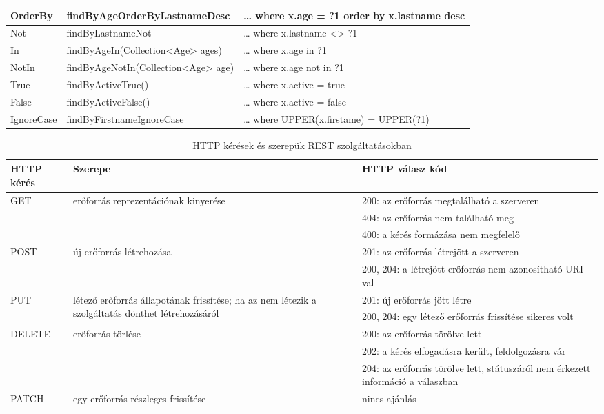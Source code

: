 \begin{longtable}{| p{.20\linewidth} | p{.30\linewidth} | p{.50\linewidth } |}
			\hline
			OrderBy &	findByAgeOrderByLastnameDesc	& … where x.age = ?1 order by x.lastname desc \\
			\hline
			Not &	findByLastnameNot	& … where x.lastname <> ?1 \\
			\hline
			In &	findByAgeIn(Collection<Age> \linebreak ages)	& … where x.age in ?1 \\
			\hline
			NotIn &	findByAgeNotIn(Collection<Age> \linebreak age)	& … where x.age not in ?1 \\
			\hline
			True &	findByActiveTrue()	& … where x.active = true \\
			\hline
			False &	findByActiveFalse()	& … where x.active = false \\
			\hline
			IgnoreCase &	findByFirstnameIgnoreCase	& … where UPPER(x.firstame) = UPPER(?1) \\
			\hline
	\end{longtable}

	\begin{longtable}{| p{.20\linewidth} | p{.50\linewidth} | p{.30\linewidth } |}		
					\caption{HTTP kérések és szerepük REST szolgáltatásokban}
		\label{tab:restAndHttp} \\
		\hline
		HTTP kérés & Szerepe & HTTP válasz kód \\
		\hline
		
		\multirow{3}{*}{GET} & \multirow{3}{*}{erőforrás reprezentációnak kinyerése} & 
		 200: az erőforrás megtalálható a szerveren \\
		 \cline{3-3}
		  & & 404: az erőforrás nem található meg \\
		  		 \cline{3-3}
		  & & 400: a kérés formázása nem megfelelő \\
		\hline
		
		\multirow{2}{*}{POST} & \multirow{2}{*}{új erőforrás létrehozása} & 
		201: az erőforrás létrejött a szerveren\\
		\cline{3-3}
		& & 200, 204: a létrejött erőforrás nem azonosítható URI-val \\
		\hline
		
		\multirow{2}{*}{PUT} & \multirow{2}{*}{\parbox{\linewidth}{létező erőforrás állapotának frissítése; ha az nem létezik a  szolgáltatás dönthet létrehozásáról}} & 
		201: új erőforrás jött létre \\
		\cline{3-3}
		& & 200, 204: egy létező erőforrás frissítése sikeres volt \\
		\hline
		
		\multirow{3}{*}{DELETE} & \multirow{3}{*}{erőforrás törlése} & 
		200: az erőforrás törölve lett \\
		\cline{3-3}
		& & 202: a kérés elfogadásra került, feldolgozásra vár \\
		\cline{3-3}
		& & 204: az erőforrás törölve lett, státuszáról nem érkezett információ a válaszban \\
		\hline
		
		PATCH & egy erőforrás részleges frissítése & nincs ajánlás\\
		\hline
	\end{longtable}